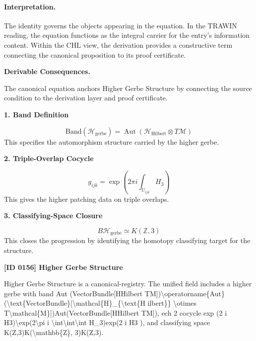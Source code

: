 \paragraph{Interpretation.}
The identity governs the objects appearing in the equation. In the TRAWIN reading, the equation functions as the integral carrier for the entry’s information content. Within the CHL view, the derivation provides a constructive term connecting the canonical proposition to its proof certificate.

\par\vspace{0.35em}
\noindent\textbf{Derivable Consequences.}\quad
\begingroup
\footnotesize
\raggedright
The canonical equation anchors Higher Gerbe Structure by connecting the source condition to the derivation layer and proof certificate.
\par\endgroup

\noindent\textbf{1. Band Definition}\par
\[
\mathrm{Band}(\mathcal{H}_{\mathrm{gerbe}})
=
\operatorname{Aut}\!\left(\mathcal{H}_{\mathrm{Hilbert}}\otimes T\mathcal{M}\right)
\]
\noindent This specifies the automorphism structure carried by the higher gerbe.\par
\noindent\textbf{2. Triple-Overlap Cocycle}\par
\[
g_{ijk}
=
\exp\!\left(2\pi i\int_{U_{ijk}} H_3\right)
\]
\noindent This gives the higher patching data on triple overlaps.\par
\noindent\textbf{3. Classifying-Space Closure}\par
\[
B\mathcal{H}_{\mathrm{gerbe}}\simeq K(\mathbb{Z},3)
\]
\noindent This closes the progression by identifying the homotopy classifying target for the structure.\par

\clearpage
\noindent\textbf{[ID 0156] Higher Gerbe Structure}\par
\vspace{0.35em}
\begingroup\small
{}
Higher Gerbe Structure is a canonical-registry. The unified field includes a higher gerbe with band Aut (VectorBundle[HHilbert TM])\textbackslash{}operatorname\{Aut\}(\textbackslash{}text\{VectorBundle\}[\textbackslash{}mathcal\{H\}\_\{\textbackslash{}text\{H ilbert\}\} \textbackslash{}otimes T\textbackslash{}mathcal\{M\}])Aut(VectorBundle[HHilbert  TM]),  ech 2 cocycle exp (2 i   H3)\textbackslash{}exp(2\textbackslash{}pi i \textbackslash{}int\textbackslash{}int\textbackslash{}int H\_3)exp(2 i   H3 ), and classifying space K(Z,3)K(\textbackslash{}mathbb\{Z\}, 3)K(Z,3).

